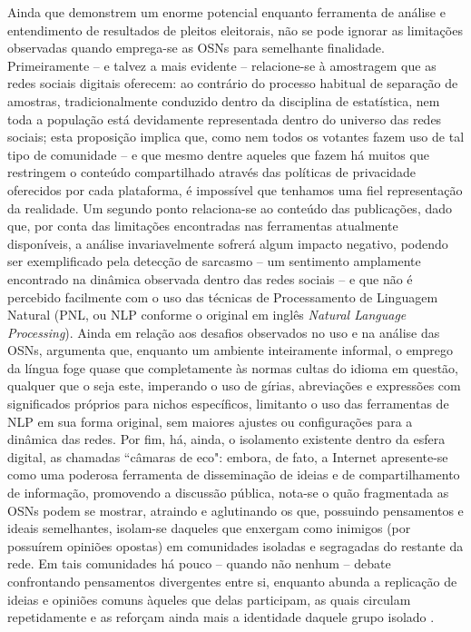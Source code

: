 \par
Ainda que demonstrem um enorme potencial enquanto ferramenta de análise e entendimento de resultados de pleitos eleitorais, não se pode ignorar as limitações observadas quando emprega-se as OSNs para semelhante finalidade. Primeiramente -- e talvez a mais evidente -- relacione-se à amostragem que as redes sociais digitais oferecem: ao contrário do processo habitual de separação de amostras, tradicionalmente conduzido dentro da disciplina de estatística, nem toda a população está devidamente representada dentro do universo das redes sociais; esta proposição implica que, como nem todos os votantes fazem uso de tal tipo de comunidade -- e que mesmo dentre aqueles que fazem há muitos que restringem o conteúdo compartilhado através das políticas de privacidade oferecidos por cada plataforma, é impossível que tenhamos uma fiel representação da realidade. Um segundo ponto relaciona-se ao conteúdo das publicações, dado que, por conta das limitações encontradas nas ferramentas atualmente disponíveis, a análise invariavelmente sofrerá algum impacto negativo, podendo ser exemplificado pela detecção de sarcasmo -- um sentimento amplamente encontrado na dinâmica observada dentro das redes sociais -- e que não é percebido facilmente \cite{chaudhry2021sentiment} com o uso das técnicas de Processamento de Linguagem Natural (PNL, ou NLP conforme o original em inglês \textit{Natural Language Processing}). Ainda em relação aos desafios observados no uso e na análise das OSNs,  argumenta que, enquanto um ambiente inteiramente informal, o emprego da língua foge quase que completamente às normas cultas do idioma em questão, qualquer que o seja este, imperando o uso de gírias, abreviações e expressões com significados próprios para nichos específicos, limitanto o uso das ferramentas de NLP em sua forma original, sem maiores ajustes ou configurações para a dinâmica das redes. Por fim, há, ainda, o isolamento existente dentro da esfera digital, as chamadas ``câmaras de eco": embora, de fato, a Internet apresente-se como uma poderosa ferramenta de disseminação de ideias e de compartilhamento de informação, promovendo a discussão pública, nota-se o quão fragmentada as OSNs podem se mostrar, atraindo e aglutinando os que, possuindo pensamentos e ideais semelhantes, isolam-se daqueles que enxergam como inimigos (por possuírem opiniões opostas) em comunidades isoladas e segragadas do restante da rede. Em tais comunidades há pouco -- quando não nenhum -- debate confrontando pensamentos divergentes entre si, enquanto abunda a replicação de ideias e opiniões comuns àqueles que delas participam, as quais circulam repetidamente e as reforçam ainda mais a identidade daquele grupo isolado \cite{takikawa2017political}.
